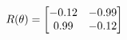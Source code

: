 \documentclass[preview]{standalone}
\begin{document}
\begin{align*}
\special{dvisvgm:raw <g id='unique000'>}R(\theta) = \begin{bmatrix}-0.12 & -0.99\\0.99 & -0.12\end{bmatrix}\special{dvisvgm:raw </g>}
\end{align*}
\end{document}
